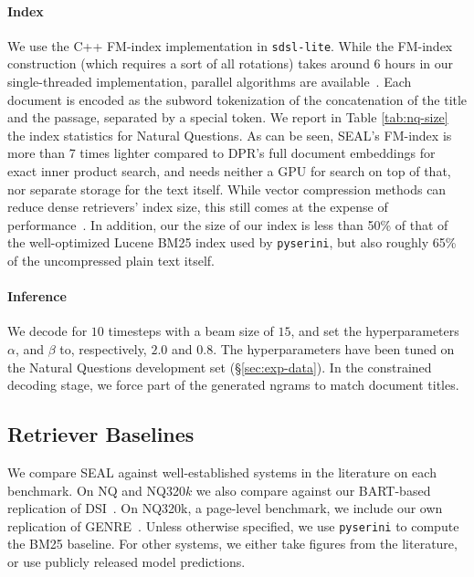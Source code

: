 \documentclass[11pt]{article}
\newcommand{\system}{\textsc{SEAL}}
\begin{document}
\paragraph{Index}
We use the C++ FM-index implementation in \texttt{sdsl-lite}.
While the FM-index construction (which requires a sort of all rotations) takes around 6 hours in our single-threaded implementation, parallel algorithms are available~\citep{LABEIT20172}. Each document is encoded as the subword tokenization of the concatenation of the title and the passage, separated by a special token. We report in Table \ref{tab:nq-size} the index statistics for Natural Questions. As can be seen, \system{}'s FM-index is more than 7 times lighter compared to DPR's full document embeddings for exact inner product search, and needs neither a GPU for search on top of that, nor separate storage for the text itself. While vector compression methods can reduce dense retrievers' index size, this still comes at the expense of performance~\citep{yamada-etal-2021-efficient,Lewis2021BoostedDR}. In addition, our the size of  our index is less than 50\% of that of the well-optimized Lucene BM25 index used by \texttt{pyserini}, but also roughly 65\% of the uncompressed plain text itself.



\paragraph{Inference} We decode for $10$ timesteps with a beam size of $15$, and set the hyperparameters $\alpha$, and $\beta$ to, respectively, $2.0$ and $0.8$. The hyperparameters have been tuned on the Natural Questions development set (§\ref{sec:exp-data}). In the constrained decoding stage, we force part of the generated ngrams to match document titles. 





\subsection{Retriever Baselines}

We compare \system{} against well-established systems in the literature on each benchmark. On NQ and NQ320$k$ we also compare against our BART-based replication of DSI~\citep[\textbf{DSI-BART}]{tay-etal-2022-transformer}. On NQ320k, a page-level benchmark, we include our own replication of GENRE~\citep{decao-etal-2021-autoregressive}. Unless otherwise specified, we use \texttt{pyserini} to compute the BM25 baseline. For other systems, we either take figures from the literature, or use publicly released model predictions.
\end{document}
